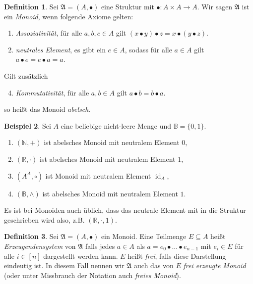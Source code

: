 \documentclass[11pt, a4paper]{article}
\theoremstyle{definition}
\newtheorem{definition}{Definition}[section]
\newtheorem{example}[definition]{Beispiel}
\theoremstyle{plain}
\numberwithin{equation}{section}
\DeclareMathOperator{\id}{id}
\begin{document}
\begin{definition}
	Sei \( \mathfrak{A} = (A, \bullet) \) eine Struktur mit \( \bullet\colon A \times A \to A \). Wir sagen \( \mathfrak{A} \) ist ein \textit{Monoid}, wenn folgende Axiome gelten:
	\begin{enumerate}
		\item \textit{Assoziativität}, für alle \( a, b, c \in A \) gilt \( (x \bullet y) \bullet z = x \bullet (y \bullet z) \).
		\item \textit{neutrales Element}, es gibt ein \( e \in A \), sodass für alle \( a \in A \) gilt \( a \bullet e = e \bullet a = a \).
	\end{enumerate}
	Gilt zusätzlich
	\begin{enumerate}\setcounter{enumi}{3}
		\item \textit{Kommutativität}, für alle \( a, b \in A \) gilt \( a \bullet b = b \bullet a \).
	\end{enumerate}
	so heißt das Monoid \textit{abelsch}.
\end{definition}
\begin{example}
	Sei \( A \) eine beliebige nicht-leere Menge und \( \mathbb{B} = \{ 0, 1 \} \).
	\begin{enumerate}
		\item \( (\mathbb{N}, +) \) ist abelsches Monoid mit neutralem Element \( 0 \),
		\item \( (\mathbb{R}, \cdot) \) ist abelsches Monoid mit neutralem Element \( 1 \),
		\item \( (A^A, \circ) \) ist Monoid mit neutralem Element \( \id_A \),
		\item \( (\mathbb{B}, \wedge) \) ist abelsches Monoid mit neutralem Element \( 1 \).
	\end{enumerate}
\end{example}
Es ist bei Monoiden auch üblich, dass das neutrale Element mit in die Struktur geschrieben wird also, z.B. \( (\mathbb{R}, \cdot, 1) \).
\begin{definition}
	Sei \( \mathfrak{A} = (A, \bullet) \) ein Monoid. Eine Teilmenge \( E \subseteq A \) heißt \textit{Erzeugendensystem} von \( \mathfrak{A} \) falls jedes \( a \in A \) als \( a = e_0 \bullet \ldots \bullet e_{n-1} \) mit \( e_i \in E \) für alle \( i \in [n] \) dargestellt werden kann. \( E \) heißt \textit{frei}, falls diese Darstellung eindeutig ist. In diesem Fall nennen wir \( \mathfrak{A} \) auch das von \( E \) \textit{frei erzeugte Monoid} (oder unter Missbrauch der Notation auch \textit{freies Monoid}).
\end{definition}
\end{document}
